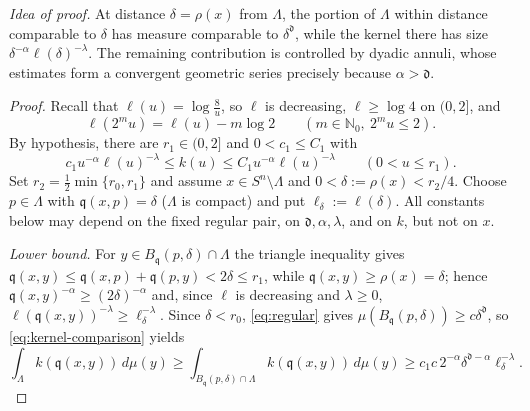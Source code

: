 \documentclass[12pt,oneside,a4paper]{article}
\theoremstyle{mytheorem}
\theoremstyle{remark}
\theoremstyle{definition}
\begin{document}
\medskip
\noindent\emph{Idea of proof.}
At distance $\delta=\rho(x)$ from $\Lambda$, the portion of $\Lambda$
within distance comparable to $\delta$ has measure comparable to
$\delta^{\mathfrak d}$, while the kernel there has size
$\delta^{-\alpha}\ell(\delta)^{-\lambda}$.  The remaining contribution
is controlled by dyadic annuli, whose estimates form a convergent
geometric series precisely because $\alpha>\mathfrak d$.


\begin{proof}
Recall that $\ell(u)=\log\frac{8}{u}$, so $\ell$ is decreasing,
$\ell\ge\log4$ on $(0,2]$, and
\begin{equation}\label{eq:ell-doubling}
 \ell(2^m u)=\ell(u)-m\log2
 \qquad(m\in\mathbb N_0,\ 2^m u\le2).
\end{equation}
By hypothesis, there are $r_1\in(0,2]$ and $0<c_1\le C_1$ with
\begin{equation}\label{eq:kernel-comparison}
 c_1u^{-\alpha}\ell(u)^{-\lambda}\le k(u)\le
 C_1u^{-\alpha}\ell(u)^{-\lambda}\qquad(0<u\le r_1).
\end{equation}
Set $r_2=\tfrac{1}{2}\min\{r_0,r_1\}$ and assume
$x\in S^n\setminus\Lambda$ and $0<\delta:=\rho(x)<r_2/4$.
Choose $p\in\Lambda$ with $\mathfrak q(x,p)=\delta$ ($\Lambda$ is compact) and
put $\ell_\delta:=\ell(\delta)$.  All constants below may depend on the fixed
regular pair, on $\mathfrak d,\alpha,\lambda$, and on $k$, but not on $x$.

\emph{Lower bound.}  For $y\in B_{\mathfrak q}(p,\delta)\cap\Lambda$ the triangle
inequality gives $\mathfrak q(x,y)\le \mathfrak q(x,p)+\mathfrak q(p,y)<2\delta\le r_1$, while
$\mathfrak q(x,y)\ge\rho(x)=\delta$; hence
$\mathfrak q(x,y)^{-\alpha}\ge(2\delta)^{-\alpha}$ and, since $\ell$ is decreasing
and $\lambda\ge0$, $\ell(\mathfrak q(x,y))^{-\lambda}\ge
\ell_\delta^{-\lambda}$.  Since
$\delta<r_0$, \eqref{eq:regular} gives
$\mu(B_{\mathfrak q}(p,\delta))\ge c\delta^{\mathfrak d}$, so \eqref{eq:kernel-comparison}
yields
\[
 \int_\Lambda k(\mathfrak q(x,y))\,d\mu(y)
 \ge\int_{B_{\mathfrak q}(p,\delta)\cap\Lambda}k(\mathfrak q(x,y))\,d\mu(y)
 \ge c_1c\,2^{-\alpha}\delta^{\mathfrak d-\alpha}
 \ell_\delta^{-\lambda}.
\]


\end{proof}
\end{document}
